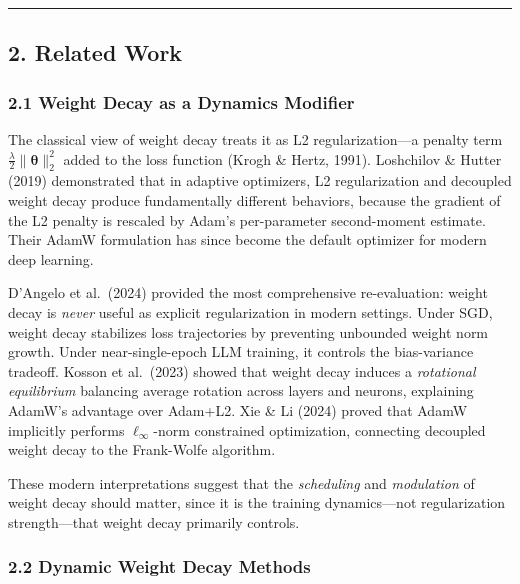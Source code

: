 \documentclass[
]{article}
\begin{document}
\begin{center}\rule{0.5\linewidth}{0.5pt}\end{center}

\hypertarget{related-work}{%
\subsection{2. Related Work}\label{related-work}}

\hypertarget{weight-decay-as-a-dynamics-modifier}{%
\subsubsection{2.1 Weight Decay as a Dynamics
Modifier}\label{weight-decay-as-a-dynamics-modifier}}

The classical view of weight decay treats it as L2 regularization---a
penalty term \(\frac{\lambda}{2}\|\boldsymbol{\theta}\|_2^2\) added to
the loss function (Krogh \& Hertz, 1991). Loshchilov \& Hutter (2019)
demonstrated that in adaptive optimizers, L2 regularization and
decoupled weight decay produce fundamentally different behaviors,
because the gradient of the L2 penalty is rescaled by Adam's
per-parameter second-moment estimate. Their AdamW formulation has since
become the default optimizer for modern deep learning.

D'Angelo et al.~(2024) provided the most comprehensive re-evaluation:
weight decay is \emph{never} useful as explicit regularization in modern
settings. Under SGD, weight decay stabilizes loss trajectories by
preventing unbounded weight norm growth. Under near-single-epoch LLM
training, it controls the bias-variance tradeoff. Kosson et al.~(2023)
showed that weight decay induces a \emph{rotational equilibrium}
balancing average rotation across layers and neurons, explaining AdamW's
advantage over Adam+L2. Xie \& Li (2024) proved that AdamW implicitly
performs \(\ell_\infty\)-norm constrained optimization, connecting
decoupled weight decay to the Frank-Wolfe algorithm.

These modern interpretations suggest that the \emph{scheduling} and
\emph{modulation} of weight decay should matter, since it is the
training dynamics---not regularization strength---that weight decay
primarily controls.

\hypertarget{dynamic-weight-decay-methods}{%
\subsubsection{2.2 Dynamic Weight Decay
Methods}\label{dynamic-weight-decay-methods}}
\end{document}

